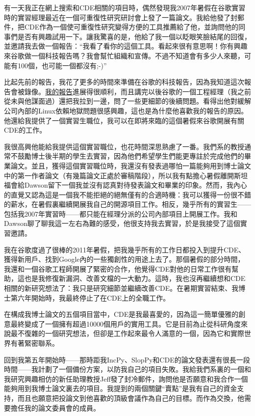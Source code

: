\documentclass[12pt,UTF8,nofonts]{book}
\begin{document}
有一天我正在網上搜索和CDE相關的項目時，偶然發現我2007年暑假在谷歌實習時的實習經理最近在一個可重復性研究研討會上發了一篇論文。我給他發了封郵件，把CDE作為一個使可重復性研究變得方便的工具推薦給了他，並詢問他的同事們是否有興趣試用一下。讓我驚喜的是，他給了我一個以眨眼笑臉結尾的回復，並邀請我去做一個報告：“我看了看你的這個工具。看起來很有意思啊！你有興趣來谷歌做一個科技報告嗎？我會幫忙組織和宣傳。不過不知道會有多少人來聽，可能有100個，也可能一個都沒有;-)”

比起先前的報告，我花了更多的時間來準備在谷歌的科技報告，因為我知道這次報告會被錄像。\href{https://www.youtube.com/watch?feature=player_embedded&v=6XdwHo1BWwY}{我的報告}進展得很順利，而且講完以後谷歌的一個工程經理（我之前從未與他謀面過）還把我拉到一邊，問了一些更細節的後續問題。看得出他對緩解公司內部的Linux依賴地獄問題很感興趣，這也是為什麼他喜歡我的報告的原因。他還給我提供了一個實習生職位，我可以在即將來臨的這個暑假來谷歌開展有關CDE的工作。

我很高興他能給我提供這個實習職位，也花時間深思熟慮了一番。我們系的教授通常不鼓勵博士後半期的學生去實習，因為他們希望學生們能更專註於完成他們的畢業論文。並且，獲得這個實習職位時，我還沒有發表過哪怕一篇能夠用到博士論文中的第一作者論文（有幾篇論文正處於審稿階段），所以我有點擔心暑假離開斯坦福會給Dawson留下一個我並沒有認真對待發表論文和畢業的印象。然而，我內心的直覺又認為這是一個我不能拒絕的絕無僅有的合適時機：我可以獲得一份很不錯的薪水，在暑假裏繼續開展我自己的開源項目工作。相反，幾乎所有的實習生——包括我2007年實習時——都只能在經理分派的公司內部項目上開展工作。我和Dawson聊了聊我這一左右為難的感受，他很支持我去實習，於是我接受了這個實習邀請。

我在谷歌度過了很棒的2011年暑假，把我幾乎所有的工作日都投入到提升CDE、獲得新用戶、找到Google內的一些獨創性的用途上去了。那個暑假的部分時間，我還和一個谷歌工程師開展了緊密的合作，他覺得CDE對他的日常工作很有幫助，這也是我修復新漏洞、改善文檔的一大動力。這時，我也沒再繼續想和CDE相關的新研究想法了：我只是研究細節並繼續改善CDE。在暑期實習結束、我博士第六年開始時，我最終停止了在CDE上的全職工作。

在構成我博士論文的五個項目當中，CDE是我最喜愛的，因為這一簡單優雅的創意最終變成了一個擁有超過10000個用戶的實用工具。它是目前為止從科研角度來說最不復雜的一個研究想法，但卻是工作起來最令人滿意的一個，因為它和實際世界有著緊密聯系。

\breakline

回到我第五年開始時——那時距我IncPy、SlopPy和CDE的論文發表還有很長一段時間——我計劃了一個備份方案，以防我自己的項目失敗。我給我們系裏的一個和我研究興趣相仿的新任助理教授Jeff發了封冷郵件，詢問他是否願意和我合作一個能夠用到我博士論文裏去的項目。我提到的兩個關鍵“賣點”是我有自己的資金支持，而且也願意把投論文到他喜歡的頂級會議作為自己的目標。而作為交換，他需要擔任我的論文委員會的成員。
\end{document}
